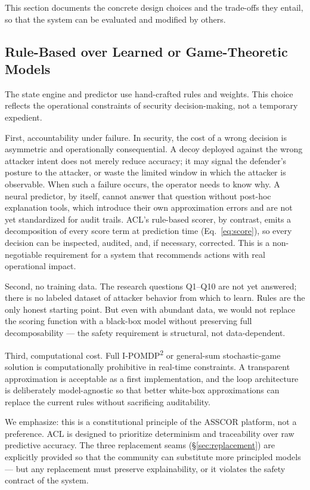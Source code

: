 \documentclass[11pt]{article}
\begin{document}
This section documents the concrete design choices and the trade-offs they
entail, so that the system can be evaluated and modified by others.

\subsection{Rule-Based over Learned or Game-Theoretic Models}
The state engine and predictor use hand-crafted rules and weights. This choice reflects the operational constraints of security decision-making, not a temporary expedient.

First, accountability under failure. In security, the cost of a wrong decision is asymmetric and operationally consequential. A decoy deployed against the wrong attacker intent does not merely reduce accuracy; it may signal the defender's posture to the attacker, or waste the limited window in which the attacker is observable. When such a failure occurs, the operator needs to know why. A neural predictor, by itself, cannot answer that question without post-hoc explanation tools, which introduce their own approximation errors and are not yet standardized for audit trails. ACL's rule-based scorer, by contrast, emits a decomposition of every score term at prediction time (Eq.~\ref{eq:score}), so every decision can be inspected, audited, and, if necessary, corrected. This is a non-negotiable requirement for a system that recommends actions with real operational impact.

Second, no training data. The research questions Q1--Q10 are not yet answered; there is no labeled dataset of attacker behavior from which to learn. Rules are the only honest starting point. But even with abundant data, we would not replace the scoring function with a black-box model without preserving full decomposability --- the safety requirement is structural, not data-dependent.

Third, computational cost. Full I-POMDP\textsuperscript{2} or general-sum stochastic-game solution is computationally prohibitive in real-time constraints. A transparent approximation is acceptable as a first implementation, and the loop architecture is deliberately model-agnostic so that better white-box approximations can replace the current rules without sacrificing auditability.

We emphasize: this is a constitutional principle of the ASSCOR platform, not a preference. ACL is designed to prioritize determinism and traceability over raw predictive accuracy. The three replacement seams (\S\ref{sec:replacement}) are explicitly provided so that the community can substitute more principled models --- but any replacement must preserve explainability, or it violates the safety contract of the system.
\end{document}
